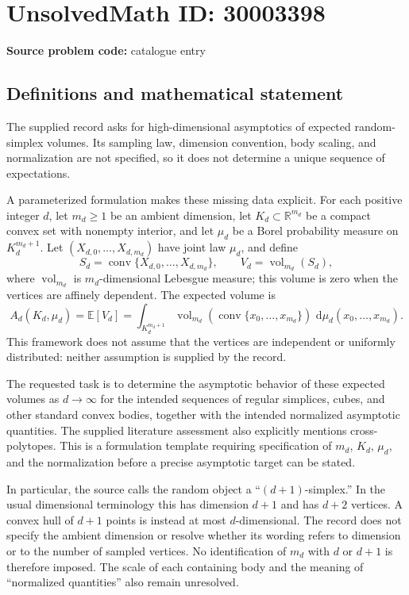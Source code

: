 \documentclass[11pt]{article}
\newcommand{\R}{\mathbb{R}}
\newcommand{\E}{\mathbb{E}}
\newcommand{\dd}{\,\mathrm{d}}
\begin{document}
\section*{UnsolvedMath ID: 30003398}
\textbf{Source problem code:} catalogue entry
\subsection{Definitions and mathematical statement}
The supplied record asks for high-dimensional asymptotics of expected random-simplex volumes. Its sampling law, dimension convention, body scaling, and normalization are not specified, so it does not determine a unique sequence of expectations.

A parameterized formulation makes these missing data explicit. For each positive integer \(d\), let \(m_d\geq 1\) be an ambient dimension, let \(K_d\subset\R^{m_d}\) be a compact convex set with nonempty interior, and let \(\mu_d\) be a Borel probability measure on \(K_d^{m_d+1}\). Let \((X_{d,0},\ldots,X_{d,m_d})\) have joint law \(\mu_d\), and define
\[
S_d=\operatorname{conv}\{X_{d,0},\ldots,X_{d,m_d}\},\qquad
V_d=\operatorname{vol}_{m_d}(S_d),
\]
where \(\operatorname{vol}_{m_d}\) is \(m_d\)-dimensional Lebesgue measure; this volume is zero when the vertices are affinely dependent. The expected volume is
\[
A_d(K_d,\mu_d)=\E[V_d]
=\int_{K_d^{m_d+1}}
\operatorname{vol}_{m_d}\!\left(\operatorname{conv}\{x_0,\ldots,x_{m_d}\}\right)
\,\dd\mu_d(x_0,\ldots,x_{m_d}).
\]
This framework does not assume that the vertices are independent or uniformly distributed: neither assumption is supplied by the record.

The requested task is to determine the asymptotic behavior of these expected volumes as \(d\to\infty\) for the intended sequences of regular simplices, cubes, and other standard convex bodies, together with the intended normalized asymptotic quantities. The supplied literature assessment also explicitly mentions cross-polytopes. This is a formulation template requiring specification of \(m_d\), \(K_d\), \(\mu_d\), and the normalization before a precise asymptotic target can be stated.

In particular, the source calls the random object a ``\((d+1)\)-simplex.'' In the usual dimensional terminology this has dimension \(d+1\) and has \(d+2\) vertices. A convex hull of \(d+1\) points is instead at most \(d\)-dimensional. The record does not specify the ambient dimension or resolve whether its wording refers to dimension or to the number of sampled vertices. No identification of \(m_d\) with \(d\) or \(d+1\) is therefore imposed. The scale of each containing body and the meaning of ``normalized quantities'' also remain unresolved.
\end{document}
